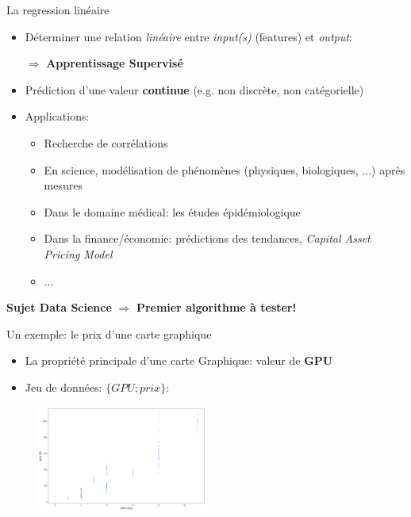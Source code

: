 \documentclass[aspectratio=169, 11pt]{beamer}
\begin{document}
\begin{frame}{La regression linéaire}
  \begin{itemize}
    
  \item Déterminer une relation \textit{linéaire} entre \textit{input(s)} (features) et \textit{output}:
    \begin{center}
      \normalsize
      \boldmath $\Rightarrow$ \unboldmath \textbf{\textcolor{agaetisOrange}{Apprentissage Supervisé}}
    \end{center}
  \item Prédiction d'une valeur \textbf{continue} (e.g. non discrète, non catégorielle)
  \item Applications:
    \begin{itemize}
      \normalsize
    \item Recherche de corrélations
    \item En science, modélisation de phénomènes (physiques, biologiques, ...) après mesures
    \item Dans le domaine médical: les études épidémiologique
    \item Dans la finance/économie: prédictions des tendances, \textit{Capital Asset Pricing Model}
    \item $\dots$
    \end{itemize}
  \end{itemize}
  \begin{center}
    \textbf{Sujet Data Science} \boldmath $\Rightarrow$ \unboldmath \textbf{Premier algorithme à tester!}
  \end{center}
\end{frame}

\begin{frame}{Un exemple: le prix d'une carte graphique}
  \begin{itemize}
  \item La propriété principale d'une carte Graphique: valeur de \textbf{GPU}
    \vspace{0.2cm}
  \item Jeu de données: $\{GPU;prix\}$:
  \end{itemize}

  \begin{figure}
    \includegraphics[width=0.5\textwidth]{figs/gpuPrices.png}    
  \end{figure}
\end{frame}
\end{document}

